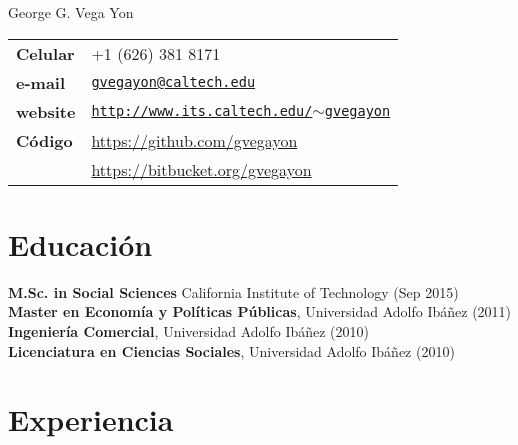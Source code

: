 \documentclass[letterpaper, 11pt]{article}
\def\name{George G. Vega Yon}
\renewenvironment{itemize}{
  \begin{list}{}{
    \setlength{\leftmargin}{0.45cm}
  }
}{
  \end{list}
}
\begin{document}
{\huge \name}


\vspace{0.25in}

\begin{minipage}{0.45\linewidth}
  \begin{tabular}{>{\bfseries}p{4cm}l}
    Celular & +1 (626) 381 8171 \\
    e-mail & \href{mailto:gvegayon@caltech.edu}{\tt gvegayon@caltech.edu} \\
    website & \href{http://www.its.caltech.edu/~gvegayon}{\tt http://www.its.caltech.edu/$\sim$gvegayon} \\
    C\'odigo & \href{https://github.com/gvegayon}{https://github.com/gvegayon}\\
    & \href{https://bitbucket.org/gvegayon}{https://bitbucket.org/gvegayon}
  \end{tabular}
\end{minipage}

\section*{Educaci\'on}

\begin{itemize}
\item {\bf M.Sc. in Social Sciences} California Institute of Technology (Sep 2015) \\
{\bf Master en Econom\'ia y Pol\'iticas P\'ublicas}, Universidad Adolfo Ib\'a\~nez (2011) \\
{\bf Ingenier\'ia Comercial}, Universidad Adolfo Ib\'a\~nez (2010) \\
{\bf Licenciatura en Ciencias Sociales}, Universidad Adolfo Ib\'a\~nez (2010) 
\end{itemize}

\section*{Experiencia}
\end{document}
